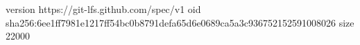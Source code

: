 version https://git-lfs.github.com/spec/v1
oid sha256:6ee1ff7981e1217ff54bc0b8791defa65d6e0689ca5a3c936752152591008026
size 22000
